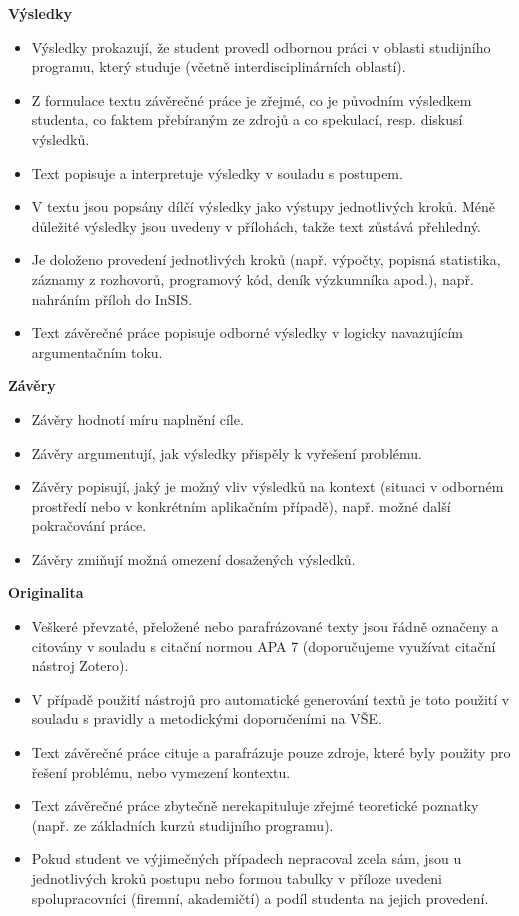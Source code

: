 {\bfseries\sffamily\Large Výsledky}
\begin{itemize}
\item \vspace*{-2ex}Výsledky prokazují, že student provedl odbornou práci v oblasti studijního programu, který studuje (včetně interdisciplinárních oblastí).
\item Z formulace textu závěrečné práce je zřejmé, co je původním výsledkem studenta, co faktem přebíraným ze zdrojů a co spekulací, resp. diskusí výsledků.
\item Text popisuje a interpretuje výsledky v souladu s postupem.
\item V textu jsou popsány dílčí výsledky jako výstupy jednotlivých kroků. Méně důležité výsledky jsou uvedeny v přílohách, takže text zůstává přehledný.
\item Je doloženo provedení jednotlivých kroků (např. výpočty, popisná statistika, záznamy z rozhovorů, programový kód, deník výzkumníka apod.), např. nahráním příloh do InSIS.
\item Text závěrečné práce popisuje odborné výsledky v logicky navazujícím argumentačním toku. 
\end{itemize}

{\bfseries\sffamily\Large Závěry}
\begin{itemize}
\item \vspace*{-2ex}Závěry hodnotí míru naplnění cíle.
\item Závěry argumentují, jak výsledky přispěly k vyřešení problému.
\item Závěry popisují, jaký je možný vliv výsledků na kontext (situaci v odborném prostředí nebo v konkrétním aplikačním případě), např. možné další pokračování práce.
\item Závěry zmiňují možná omezení dosažených výsledků.
\end{itemize}

{\bfseries\sffamily\Large Originalita}
\begin{itemize}
\item \vspace*{-2ex}Veškeré převzaté, přeložené nebo parafrázované texty jsou řádně označeny a citovány v souladu s citační normou APA 7 (doporučujeme využívat citační nástroj Zotero).
\item V případě použití nástrojů pro automatické generování textů je toto použití v souladu s pravidly a metodickými doporučeními na VŠE.
\item Text závěrečné práce cituje a parafrázuje pouze zdroje, které byly použity pro řešení problému, nebo vymezení kontextu.
\item Text závěrečné práce zbytečně nerekapituluje zřejmé teoretické poznatky (např. ze základních kurzů studijního programu).
\item Pokud student ve výjimečných případech nepracoval zcela sám, jsou u jednotlivých kroků postupu nebo formou tabulky v příloze uvedeni spolupracovníci (firemní, akademičtí) a podíl studenta na jejich provedení.
\end{itemize}

